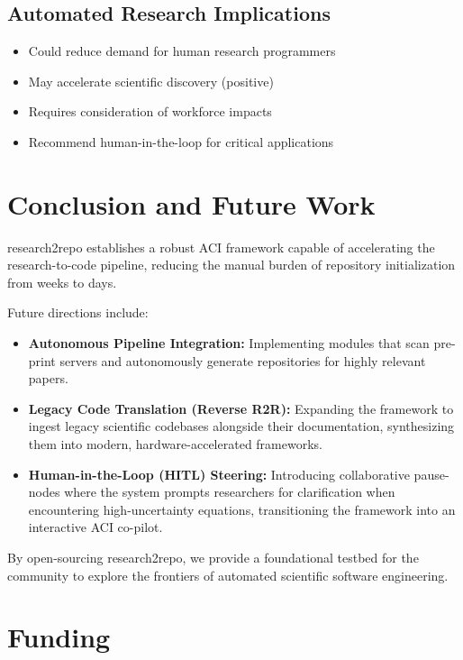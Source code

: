 \documentclass[10pt]{article}
\begin{document}
\subsection{Automated Research Implications}
\begin{itemize}
    \item Could reduce demand for human research programmers
    \item May accelerate scientific discovery (positive)
    \item Requires consideration of workforce impacts
    \item Recommend human-in-the-loop for critical applications
\end{itemize}

\section{Conclusion and Future Work}

research2repo establishes a robust ACI framework capable of accelerating the research-to-code pipeline, reducing the manual burden of repository initialization from weeks to days.

Future directions include:

\begin{itemize}
    \item \textbf{Autonomous Pipeline Integration:} Implementing modules that scan pre-print servers and autonomously generate repositories for highly relevant papers.
    \item \textbf{Legacy Code Translation (Reverse R2R):} Expanding the framework to ingest legacy scientific codebases alongside their documentation, synthesizing them into modern, hardware-accelerated frameworks.
    \item \textbf{Human-in-the-Loop (HITL) Steering:} Introducing collaborative pause-nodes where the system prompts researchers for clarification when encountering high-uncertainty equations, transitioning the framework into an interactive ACI co-pilot.
\end{itemize}

By open-sourcing research2repo, we provide a foundational testbed for the community to explore the frontiers of automated scientific software engineering.

\section*{Funding}
\end{document}

